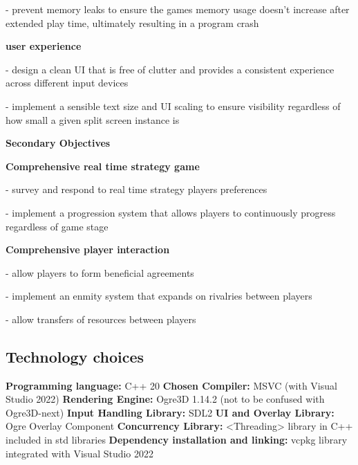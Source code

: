\documentclass[]{final_report}
\begin{document}
 - prevent memory leaks to ensure the games memory usage doesn’t increase after extended play time, ultimately resulting in a program crash

 \textbf{user experience} \newline

 - design a clean UI that is free of clutter and provides a consistent experience across different input devices

 - implement a sensible text size and UI scaling to ensure visibility regardless of how small a given split screen instance is 

\textbf{Secondary Objectives} \newline

\textbf{Comprehensive real time strategy game}\newline

 - survey and respond to real time strategy players preferences
 
 - implement a progression system that allows players to continuously progress regardless of game stage
 
 \textbf{Comprehensive player interaction} \newline
 
 - allow players to form beneficial agreements 
 
 - implement an enmity system that expands on rivalries between players
 
 - allow transfers of resources between players
 

\subsection{Technology choices}

\textbf{Programming language: } C++ 20 \newline
\textbf{Chosen Compiler: } MSVC (with Visual Studio 2022) \newline
\textbf{Rendering Engine:} Ogre3D 1.14.2 (not to be confused with Ogre3D-next) \newline
\textbf{Input Handling Library:} SDL2 \newline
\textbf{UI and Overlay Library: } Ogre Overlay Component \newline
\textbf{Concurrency Library: } <Threading> library in C++ included in std libraries \newline
\textbf{Dependency installation and linking: } vcpkg library integrated with Visual Studio 2022 \newline
\end{document}
